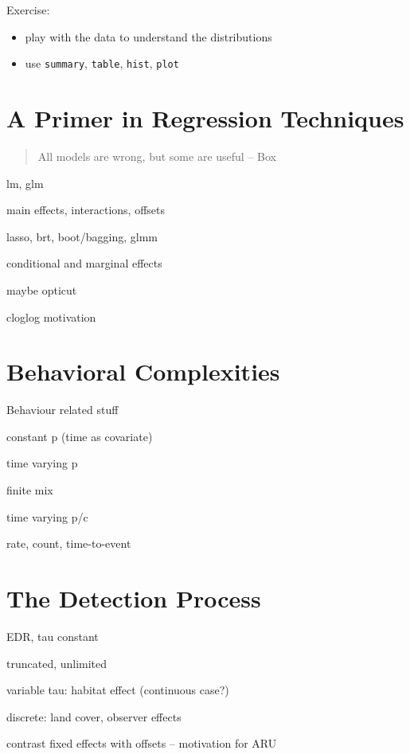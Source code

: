 \documentclass[12pt,]{book}
\providecommand{\tightlist}{%
  \setlength{\itemsep}{0pt}\setlength{\parskip}{0pt}}
\begin{document}
Exercise:

\begin{itemize}
\tightlist
\item
  play with the data to understand the distributions
\item
  use \texttt{summary}, \texttt{table}, \texttt{hist}, \texttt{plot}
\end{itemize}

\hypertarget{regression}{%
\chapter{A Primer in Regression Techniques}\label{regression}}

\begin{quote}
All models are wrong, but some are useful -- Box
\end{quote}

lm, glm

main effects, interactions, offsets

lasso, brt, boot/bagging, glmm

conditional and marginal effects

maybe opticut

cloglog motivation

\hypertarget{behavior}{%
\chapter{Behavioral Complexities}\label{behavior}}

Behaviour related stuff

constant p (time as covariate)

time varying p

finite mix

time varying p/c

rate, count, time-to-event

\hypertarget{detection}{%
\chapter{The Detection Process}\label{detection}}

EDR, tau constant

truncated, unlimited

variable tau: habitat effect (continuous case?)

discrete: land cover, observer effects

contrast fixed effects with offsets -- motivation for ARU
\end{document}
